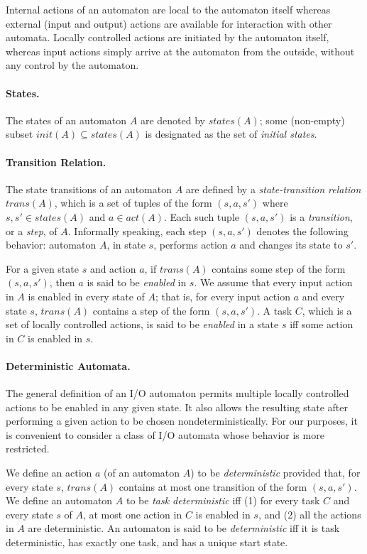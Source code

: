\documentclass[11pt]{article}
\numberwithin{theorem}{section}
\begin{document}
Internal actions of an automaton are local to the automaton itself
whereas external (input and output) actions are available for
interaction with other automata.
Locally controlled actions are initiated by the automaton itself,
whereas input actions simply arrive at the automaton from the outside, 
without any control by the automaton.

\paragraph{States.} 
The states of an automaton $A$ are denoted by $states(A)$; some
(non-empty) subset $init(A) \subseteq states(A)$ is designated as the
set of \emph{initial states}. 

\paragraph{Transition Relation.}
The state transitions of an automaton $A$ are defined by a
\emph{state-transition relation} $trans(A)$, which is a set
of tuples of the form $(s,a,s')$ where $s,s'\in states(A)$ and $a \in
act(A)$. 
Each such tuple $(s,a,s')$ is a \emph{transition}, or a \emph{step},
of $A$.
Informally speaking, each step $(s,a,s')$ denotes the following
behavior:  automaton $A$, in state $s$, performs action $a$ and
changes its state to $s'$. 

For a given state $s$ and action $a$, if $trans(A)$ contains some step
of the form $(s,a,s')$, then $a$ is said to be \emph{enabled} in
$s$. 
We assume that every input action in $A$ is enabled in every state of
$A$; that is, for every input action $a$ and every state $s$,
$trans(A)$ contains a step of the form $(s,a,s')$.
A task $C$, which is a set of locally controlled actions, is said to
be \emph{enabled} in a state $s$ iff some action in $C$ is enabled in
$s$.

\paragraph{Deterministic Automata.}
The general definition of an I/O automaton permits multiple locally
controlled actions to be enabled in any given state. 
It also allows the resulting state after performing a given action to
be chosen nondeterministically. 
For our purposes, it is convenient to consider a class of I/O automata
whose behavior is more restricted. 

We define an action $a$ (of an automaton $A$) to be
\emph{deterministic} provided that, for every state $s$, $trans(A)$
contains at most one transition of the form $(s,a,s')$.
We define an automaton $A$ to be \emph{task deterministic} iff (1) for
every task $C$ and every state $s$ of $A$, at most one action in $C$
is enabled in $s$, and (2) all the actions in $A$ are deterministic. 
An automaton is said to be \emph{deterministic} iff it
is task deterministic, has exactly one task, and has a unique start
state.
\end{document}

